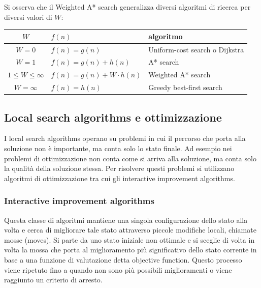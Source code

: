 Si osserva che il Weighted A* search generalizza diversi algoritmi di ricerca per diversi valori di \(W\):
\begin{center}
	\begin{tabular}{c l l}
		\toprule
		\(W\) & \(f(n)\) & algoritmo \\
		\midrule
		\(W = 0\) & \(f(n) = g(n)\) & Uniform-cost search o Dijkstra \\
		\(W = 1\) & \(f(n) = g(n) + h(n)\) & A* search \\
		\(1 \leq W \leq \infty\) & \(f(n) = g(n) + W \cdot h(n)\) & Weighted A* search \\
		\(W = \infty\) & \(f(n) = h(n)\) & Greedy best-first search \\
		\bottomrule
	\end{tabular}
\end{center}

\subsection{Local search algorithms e ottimizzazione}
I local search algorithms operano su problemi in cui il percorso che porta alla soluzione non è importante, ma conta solo
lo stato finale. Ad esempio nei problemi di ottimizzazione non conta come si arriva alla soluzione, ma conta solo la qualità
della soluzione stessa. Per risolvere questi problemi si utilizzano algoritmi di ottimizzazione tra cui gli interactive
improvement algorithms.

\subsubsection*{Interactive improvement algorithms}
Questa classe di algoritmi mantiene una singola configurazione dello stato alla volta e cerca di migliorare tale stato attraverso
piccole modifiche locali, chiamate mosse (moves). Si parte da uno stato iniziale non ottimale e si sceglie di volta in volta la
mossa che porta al miglioramento più significativo dello stato corrente in base a una funzione di valutazione detta objective
function. Questo processo viene ripetuto fino a quando non sono più possibili miglioramenti o viene raggiunto un criterio di
arresto.

